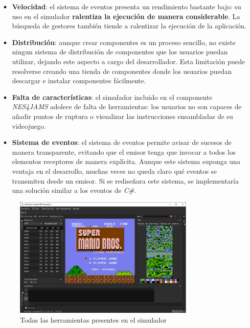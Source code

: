 \begin{itemize}
    \item \textbf{Velocidad}: el sistema de eventos
    presenta un rendimiento bastante bajo: su uso
    en el simulador \textbf{ralentiza la ejecución
    de manera considerable}.
    La búsqueda de gestores también tiende a ralentizar
    la ejecución de la aplicación.
    \item \textbf{Distribución}: aunque crear componentes
    es un proceso sencillo, no existe ningun sistema de
    distribución de componentes que los usuarios puedan
    utilizar, dejando este aspecto a cargo del desarrollador.
    Esta limitación puede resolverse creando una tienda de
    componentes donde los usuarios puedan descargar e instalar
    componentes fácilmente.
    \item \textbf{Falta de características}: el simulador
    incluido en el componente \textit{NES4JAMS} adolece
    de falta de herramientas: los usuarios no son
    capaces de añadir puntos de ruptura o visualizar
    las instrucciones ensambladas de su videojuego.
    \item \textbf{Sistema de eventos}: el sistema de eventos
    permite avisar de sucesos de manera transparente, evitando
    que el emisor tenga que invocar a todos los elementos
    receptores de manera explícita.
    Aunque este sistema suponga una ventaja en el desarrollo,
    muchas veces no queda claro qué eventos se transmiten desde
    un emisor.
    Si se rediseñara este sistema, se implementaría
    una solución similar a los eventos de \textit{C\#}.
\end{itemize}

\begin{figure}[h]
    \centering
    \includegraphics[width=0.8\textwidth]{images/conclusions/nes-simulator-tools}
    \caption{Todas las herramientas presentes en el simulador}
    \label{fig:nes-conclusions-tools}
\end{figure}

